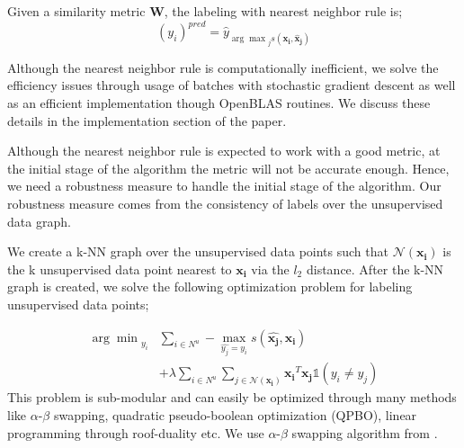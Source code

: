 Given a similarity metric $\mathbf{W}$, the labeling with nearest neighbor rule is;
\begin{equation}
(y_i)^{pred} = \hat{y}_{{\arg\max}_j s(\mathbf{x_i}, \mathbf{\hat{x}_j})}
\end{equation}

Although the nearest neighbor rule is computationally inefficient, we solve the efficiency issues through usage of batches with stochastic gradient descent as well as an efficient implementation though OpenBLAS routines. We discuss these details in the implementation section of the paper.

Although the nearest neighbor rule is expected to work with a good metric, at the initial stage of the algorithm the metric will not be accurate enough. Hence, we need a robustness measure to handle the initial stage of the algorithm. Our robustness measure comes from the consistency of labels over the unsupervised data graph.

We create a k-NN graph over the unsupervised data points such that $\mathcal{N}(\mathbf{x_i})$ is the k  unsupervised data point nearest to $\mathbf{x_i}$ via the $l_2$ distance. After the k-NN graph is created, we solve the following optimization problem for labeling unsupervised data points;

\begin{equation}
\begin{aligned}
{\arg\min}_{y_i}  &\sum_{i \in N^u} - \max_{\hat{y_j}=y_i}  s(\mathbf{\hat{x_j}},\mathbf{x_{i}}) \\
&+ \lambda
\sum_{i \in N^u} \sum_{j \in \mathcal{N}(\mathbf{x_i})} \mathbf{x_i}^T \mathbf{x_j}\mathds{1}(y_i \neq y_j)
\end{aligned}
\end{equation}
This problem is sub-modular and can easily be optimized through many methods like $\alpha$-$\beta$ swapping, quadratic pseudo-boolean optimization (QPBO), linear programming through roof-duality etc. We use $\alpha$-$\beta$ swapping algorithm from \cite{kolmogrovalphabeta}. 


